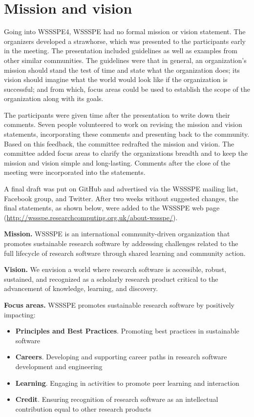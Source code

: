 \documentclass[11pt, oneside]{amsart}
\newcommand{\note}[1]{ {\textcolor{blueish}    { ***Note:      #1 }}}
\begin{document}
\section{Mission and vision}\label{sec:mission}


Going into WSSSPE4, WSSSPE had no formal mission or vision statement.
The organizers developed a strawhorse, which was presented to the participants early in the meeting.
The presentation included guidelines as well as examples from other similar communities.
The guidelines were that in general, an organization's mission should stand the test of time and state what the organization does; its vision should imagine what the world would look like if the organization is successful; and from which, focus areas could be used to establish the scope of the organization along with its goals.

The participants were given time after the presentation to write down their comments.
Seven people volunteered to work on revising the mission and vision statements, incorporating these comments and presenting back to the community.
Based on this feedback, the committee redrafted the mission and vision.
The committee added focus areas to clarify the organizations breadth and to keep the mission and vision simple and long-lasting.
Comments after the close of the meeting were incorporated into the statements.

A final draft was put on GitHub and advertised
via the WSSSPE mailing list, Facebook group, and Twitter.
After two weeks without suggested changes, the final statements, as shown below, were added
to the WSSSPE web page (\url{http://wssspe.researchcomputing.org.uk/about-wssspe/}).

{\bf Mission.}
WSSSPE is an international community-driven organization that promotes sustainable research software by addressing challenges related to the full lifecycle of research software through shared learning and community action.

{\bf Vision.}
We envision a world where research software is accessible, robust, sustained, and recognized as a scholarly research product critical to the advancement of knowledge, learning, and discovery.

{\bf Focus areas.}
WSSSPE promotes sustainable research software by positively impacting:
\begin{itemize}
\item {\bf Principles and Best Practices}. Promoting best practices in sustainable software
\item {\bf Careers}. Developing and supporting career paths in research software development and engineering
\item {\bf Learning}. Engaging in activities to promote peer learning and interaction
\item {\bf Credit}. Ensuring recognition of research software as an intellectual contribution equal to other research products
\end{itemize}
\end{document}
